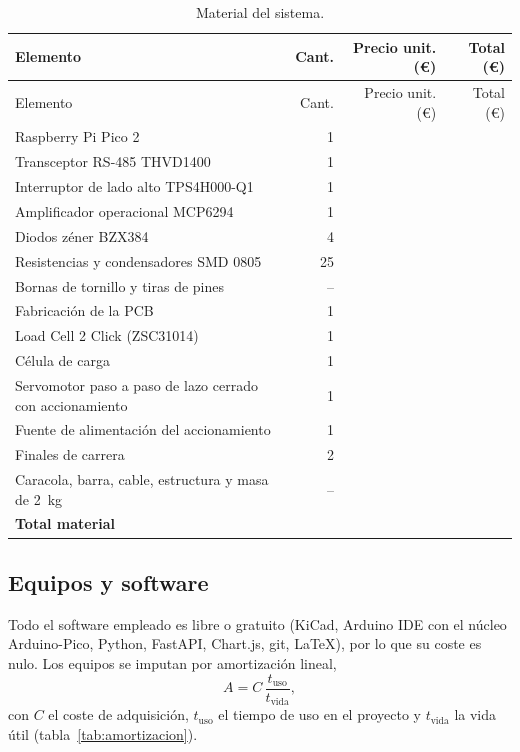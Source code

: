 \begin{longtable}{@{}L{0.42\textwidth}rrr@{}}
\caption{Material del sistema.}\label{tab:material}\\
\toprule
Elemento & Cant. & Precio unit. (€) & Total (€) \\
\midrule
\endfirsthead
\toprule
Elemento & Cant. & Precio unit. (€) & Total (€) \\
\midrule
\endhead
Raspberry Pi Pico 2 & 1 & \completar{} & \\
Transceptor RS-485 THVD1400 & 1 & \completar{} & \\
Interruptor de lado alto TPS4H000-Q1 & 1 & \completar{} & \\
Amplificador operacional MCP6294 & 1 & \completar{} & \\
Diodos zéner BZX384 & 4 & \completar{} & \\
Resistencias y condensadores SMD 0805 & 25 & \completar{} & \\
Bornas de tornillo y tiras de pines & -- & \completar{} & \\
Fabricación de la PCB & 1 & \completar{} & \\
Load Cell 2 Click (ZSC31014) & 1 & \completar{} & \\
Célula de carga & 1 & \completar{} & \\
Servomotor paso a paso de lazo cerrado con accionamiento & 1 & \completar{} & \\
Fuente de alimentación del accionamiento & 1 & \completar{} & \\
Finales de carrera & 2 & \completar{} & \\
Caracola, barra, cable, estructura y masa de \SI{2}{\kilo\gram} & -- & \completar{} & \\
\midrule
\textbf{Total material} & & & \completar{} \\
\bottomrule
\end{longtable}

\subsection{Equipos y software}

Todo el software empleado es libre o gratuito (KiCad, Arduino IDE con el núcleo Arduino-Pico,
Python, FastAPI, Chart.js, git, \LaTeX), por lo que su coste es nulo. Los equipos se imputan por
amortización lineal,
\begin{equation}
  A = C\,\frac{t_{\text{uso}}}{t_{\text{vida}}},
\end{equation}
con $C$ el coste de adquisición, $t_{\text{uso}}$ el tiempo de uso en el proyecto y $t_{\text{vida}}$ la
vida útil (tabla~\ref{tab:amortizacion}).

